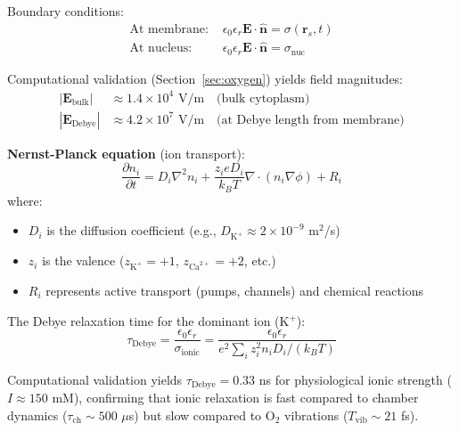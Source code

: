 \documentclass[twocolumn,10pt,aps,prd,superscriptaddress,floatfix,nofootinbib]{revtex4-2}
\theoremstyle{remark}
\begin{document}
Boundary conditions:
\begin{align}
\text{At membrane: } & \epsilon_0\epsilon_r \mathbf{E} \cdot \hat{\mathbf{n}} = \sigma(\mathbf{r}_s, t) \label{eq:bc_membrane} \\
\text{At nucleus: } & \epsilon_0\epsilon_r \mathbf{E} \cdot \hat{\mathbf{n}} = \sigma_{\mathrm{nuc}} \label{eq:bc_nucleus}
\end{align}

Computational validation (Section~\ref{sec:oxygen}) yields field magnitudes:
\begin{align}
|\mathbf{E}_{\mathrm{bulk}}| &\approx 1.4 \times 10^4 \text{ V/m} \quad \text{(bulk cytoplasm)} \\
|\mathbf{E}_{\mathrm{Debye}}| &\approx 4.2 \times 10^7 \text{ V/m} \quad \text{(at Debye length from membrane)}
\end{align}

\textbf{Nernst-Planck equation} (ion transport):
\begin{equation}
\frac{\partial n_i}{\partial t} = D_i\nabla^2 n_i + \frac{z_i e D_i}{k_B T}\nabla \cdot (n_i \nabla\phi) + R_i
\label{eq:nernst_planck}
\end{equation}
where:
\begin{itemize}
\item $D_i$ is the diffusion coefficient (e.g., $D_{\mathrm{K}^+} \approx 2 \times 10^{-9}$ m$^2$/s)
\item $z_i$ is the valence ($z_{\mathrm{K}^+} = +1$, $z_{\mathrm{Ca}^{2+}} = +2$, etc.)
\item $R_i$ represents active transport (pumps, channels) and chemical reactions
\end{itemize}

The Debye relaxation time for the dominant ion (K$^+$):
\begin{equation}
\tau_{\mathrm{Debye}} = \frac{\epsilon_0\epsilon_r}{\sigma_{\mathrm{ionic}}} = \frac{\epsilon_0\epsilon_r}{e^2\sum_i z_i^2 n_i D_i / (k_B T)}
\label{eq:debye_time}
\end{equation}

Computational validation yields $\tau_{\mathrm{Debye}} = 0.33$ ns for physiological ionic strength ($I \approx 150$ mM), confirming that ionic relaxation is fast compared to chamber dynamics ($\tau_{\mathrm{ch}} \sim 500$ $\mu$s) but slow compared to O$_2$ vibrations ($T_{\mathrm{vib}} \sim 21$ fs).
\end{document}
